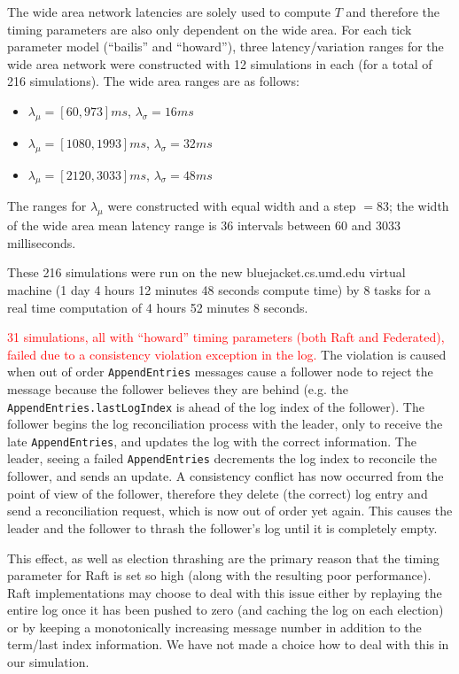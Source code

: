 \documentclass[11pt,letterpaper]{article}
\begin{document}
The wide area network latencies are solely used to compute $T$ and therefore the timing parameters are also only dependent on the wide area. For each tick parameter model (``bailis'' and ``howard''), three latency/variation ranges for the wide area network were constructed with 12 simulations in each (for a total of 216 simulations). The wide area ranges are as follows:

\begin{itemize}
    \item $\lambda_{\mu} = [60,973]ms$, $\lambda_{\sigma}=16ms$
    \item $\lambda_{\mu} = [1080,1993]ms$, $\lambda_{\sigma}=32ms$
    \item $\lambda_{\mu} = [2120,3033]ms$, $\lambda_{\sigma}=48ms$
\end{itemize}

The ranges for $\lambda_{\mu}$ were constructed with equal width and a step $=83$; the width of the wide area mean latency range is 36 intervals between 60 and 3033 milliseconds.

These 216 simulations were run on the new bluejacket.cs.umd.edu virtual machine (1 day 4 hours 12 minutes 48 seconds compute time) by 8 tasks for a real time computation of 4 hours 52 minutes 8 seconds.

\textcolor{red}{31 simulations, all with ``howard'' timing parameters (both Raft and Federated), failed due to a consistency violation exception in the log.} The violation is caused when out of order \texttt{AppendEntries} messages cause a follower node to reject the message because the follower believes they are behind (e.g. the \texttt{AppendEntries.lastLogIndex} is ahead of the log index of the follower). The follower begins the log reconciliation process with the leader, only to receive the late \texttt{AppendEntries}, and updates the log with the correct information. The leader, seeing a failed \texttt{AppendEntries} decrements the log index to reconcile the follower, and sends an update. A consistency conflict has now occurred from the point of view of the follower, therefore they delete (the correct) log entry and send a reconciliation request, which is now out of order yet again. This causes the leader and the follower to thrash the follower's log until it is completely empty.

This effect, as well as election thrashing are the primary reason that the timing parameter for Raft is set so high (along with the resulting poor performance). Raft implementations may choose to deal with this issue either by replaying the entire log once it has been pushed to zero (and caching the log on each election) or by keeping a monotonically increasing message number in addition to the term/last index information. We have not made a choice how to deal with this in our simulation.
\end{document}
